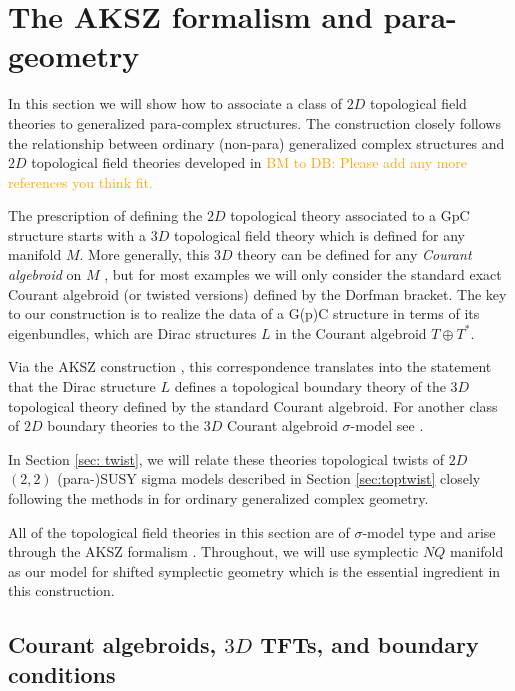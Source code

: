 \documentclass{article}
\newcommand{\TT}{{T\oplus T^*}}
\theoremstyle{definition}
\theoremstyle{remark}
\def\brian{\textcolor{blue}{BM: }\textcolor{blue}}
\def\btd{\textcolor{orange}{BM to DB: }\textcolor{orange}}
\begin{document}
 

\section{The AKSZ formalism and para-geometry}
\def\fg{\mathfrak{g}}
In this section we will show how to associate a class of $2D$ topological field theories to generalized para-complex structures.
The construction closely follows the relationship between ordinary (non-para) generalized complex structures \cite{Gualtieri:2003dx} and $2D$ topological field theories developed in \cite{Cattaneo:2009zx, Pestun:2006rj} \btd{Please add any more references you think fit.}

The prescription of defining the $2D$ topological theory associated to a GpC structure starts with a $3D$ topological field theory which is defined for any manifold $M$. 
More generally, this $3D$ theory can be defined for any {\em Courant algebroid} on $M$ \cite{Roytenberg:2002nu}, but for most examples we will only consider the standard exact Courant algebroid (or twisted versions) defined by the Dorfman bracket.
The key to our construction is to realize the data of a G(p)C structure in terms of its eigenbundles, which are Dirac structures $L$ in the Courant algebroid $\TT$. 

Via the AKSZ construction \cite{AKSZ}, this correspondence translates into the statement that the Dirac structure $L$ defines a topological boundary theory of the $3D$ topological theory defined by the standard Courant algebroid.
For another class of $2D$ boundary theories to the $3D$ Courant algebroid $\sigma$-model see \cite{SeveraTduality}. 

In Section \ref{sec: twist}, we will relate these theories topological twists of $2D$ $(2,2)$ (para-)SUSY sigma models described in Section \ref{sec:toptwist} closely following the methods in \cite{Kapustin:2004gv} for ordinary generalized complex geometry.

All of the topological field theories in this section are of $\sigma$-model type and arise through the AKSZ formalism \cite{AKSZ}. 
Throughout, we will use symplectic $NQ$ manifold as our model for shifted symplectic geometry which is the essential ingredient in this construction. 


\subsection{Courant algebroids, $3D$ TFTs, and boundary conditions}
\end{document}
